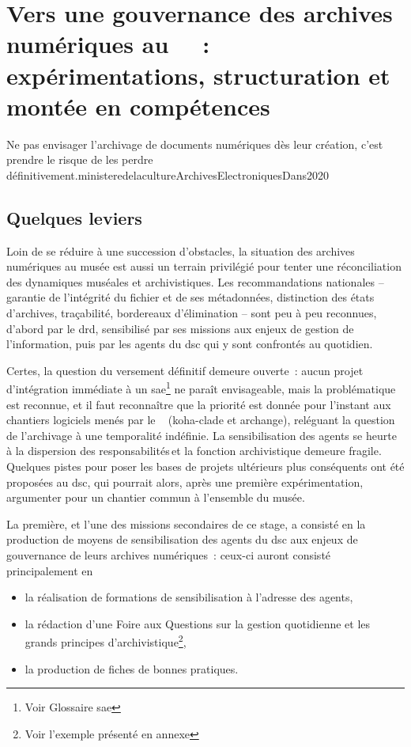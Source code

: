 \section{\label{II-C-2}Vers une gouvernance des archives numériques au \mae~~: expérimentations, structuration et montée en compétences}


\begin{myquote}
	{Ne pas envisager l’archivage de documents numériques dès leur création, c’est prendre le risque de les perdre définitivement.}{ministeredelacultureArchivesElectroniquesDans2020}
\end{myquote}

\subsection{Quelques leviers}


Loin de se réduire à une succession d’obstacles, la situation des archives numériques au musée est aussi un terrain privilégié pour tenter une réconciliation des dynamiques muséales et archivistiques. Les recommandations nationales – garantie de l'intégrité du fichier et de ses métadonnées, distinction des états d’archives, traçabilité, bordereaux d’élimination – sont peu à peu reconnues, d'abord par le \ac{drd}, sensibilisé par ses missions aux enjeux de gestion de l'information, puis par les agents du \ac{dsc} qui y sont confrontés au quotidien.



Certes, la question du versement définitif demeure ouverte~: aucun projet d'intégration immédiate à un \gls{sae}\footnote{Voir Glossaire \gls{sae}} ne paraît envisageable, mais la problématique est reconnue, et il faut reconnaître que la priorité est donnée pour l'instant aux chantiers logiciels menés par le \minarm~ (\gls{koha}-\gls{clade} et \gls{archange}), reléguant la question de l’archivage à une temporalité indéfinie. La sensibilisation des agents se heurte à la dispersion des responsabilités et la fonction archivistique demeure fragile. Quelques pistes pour poser les bases de projets ultérieurs plus conséquents ont été proposées au \ac{dsc}, qui pourrait alors, après une première expérimentation, argumenter pour un chantier commun à l'ensemble du musée.


La première, et l'une des missions secondaires de ce stage, a consisté en la production de moyens de sensibilisation des agents du \ac{dsc} aux enjeux de gouvernance de leurs archives numériques~: ceux-ci auront consisté principalement en 
\begin{itemize}
	\item la réalisation de formations de sensibilisation à l’adresse des agents,
	\item la rédaction d’une Foire aux Questions sur la gestion quotidienne et les grands principes d'archivistique\footnote{Voir l'exemple présenté en annexe },
	\item la production de fiches de bonnes pratiques.
\end{itemize}

